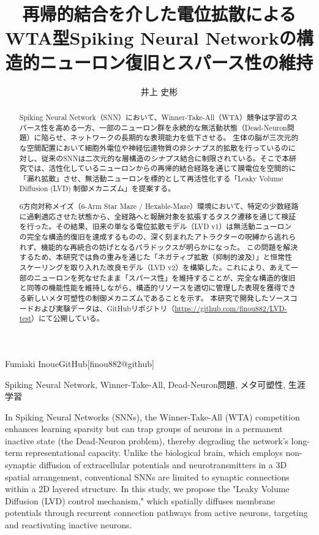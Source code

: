 \documentclass[submit]{ipsj}
\begin{document}
\title{再帰的結合を介した電位拡散によるWTA型Spiking Neural Networkの構造的ニューロン復旧とスパース性の維持}


\author{井上 史彬}{Fumiaki Inoue}{GitHub}[finou882@github]

\begin{abstract}
Spiking Neural Network（SNN）において、Winner-Take-All（WTA）競争は学習のスパース性を高める一方、一部のニューロン群を永続的な無活動状態（Dead-Neuron問題）に陥らせ、ネットワークの長期的な表現能力を低下させる。
生体の脳が三次元的な空間配置において細胞外電位や神経伝達物質の非シナプス的拡散を行っているのに対し、従来のSNNは二次元的な層構造のシナプス結合に制限されている。そこで本研究では、活性化しているニューロンからの再帰的結合経路を通じて膜電位を空間的に「漏れ拡散」させ、無活動ニューロンを標的として再活性化する「Leaky Volume Diffusion (LVD) 制御メカニズム」を提案する。

6方向対称メイズ（6-Arm Star Maze / Hexable-Maze）環境において、特定の少数経路に過剰適応させた状態から、全経路へと報酬対象を拡張するタスク遷移を通じて検証を行った。その結果、旧来の単なる電位拡散モデル（LVD v1）は無活動ニューロンの完全な構造的復旧を達成するものの、深く刻まれたアトラクターの呪縛から逃れられず、機能的な再統合の妨げとなるパラドックスが明らかになった。
この問題を解決するため、本研究では負の重みを通じた「ネガティブ拡散（抑制的波及）」と恒常性スケーリングを取り入れた改良モデル（LVD v2）を構築した。これにより、あえて一部のニューロンを死なせたまま「スパース性」を維持することが、完全な構造的復旧と同等の機能性能を維持しながら、構造的リソースを適切に管理した表現を獲得できる新しいメタ可塑性の制御メカニズムであることを示す。
本研究で開発したソースコードおよび実験データは、GitHubリポジトリ（\url{https://github.com/finou882/LVD-test}）にて公開している\cite{inoue2026lvd}。
\end{abstract}

\begin{jkeyword}
Spiking Neural Network, Winner-Take-All, Dead-Neuron問題, メタ可塑性, 生涯学習
\end{jkeyword}

\begin{eabstract}
In Spiking Neural Networks (SNNs), the Winner-Take-All (WTA) competition enhances learning sparsity but can trap groups of neurons in a permanent inactive state (the Dead-Neuron problem), thereby degrading the network's long-term representational capacity. Unlike the biological brain, which employs non-synaptic diffusion of extracellular potentials and neurotransmitters in a 3D spatial arrangement, conventional SNNs are limited to synaptic connections within a 2D layered structure. In this study, we propose the "Leaky Volume Diffusion (LVD) control mechanism," which spatially diffuses membrane potentials through recurrent connection pathways from active neurons, targeting and reactivating inactive neurons. 
\end{eabstract}
\end{document}
